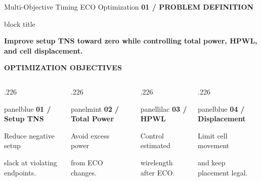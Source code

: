 \documentclass[aspectratio=169,10pt]{beamer}
\newcommand{\smalllabel}[1]{{\scriptsize\bfseries\color{Accent}\MakeUppercase{#1}}}
\newcommand{\takeaway}[1]{%
  \begin{beamercolorbox}[rounded=true,sep=0.15cm,wd=\linewidth]{block title}%
    \strut\textbf{#1}\strut
  \end{beamercolorbox}%
}
\newcommand{\slideposition}{}
\newcommand{\slidesubtitle}[1]{%
  \smalllabel{#1}%
}
\begin{document}
\renewcommand{\slideposition}{Summary 14 / 18}
\begin{frame}[label=summary-14]{Multi-Objective Timing ECO Optimization}
  \vspace{.01cm}
  \slidesubtitle{01 / Problem Definition}\par\vspace{.10cm}
  \takeaway{Improve setup TNS toward zero while controlling total power, HPWL, and cell displacement.}
  \vspace{.14cm}

  \smalllabel{Optimization Objectives}\par\vspace{.08cm}
  \begin{columns}[T,onlytextwidth]
    \begin{column}{.226\textwidth}
      \begin{beamercolorbox}[rounded=true,sep=.14cm,wd=\linewidth]{panelblue}
        {\small\bfseries\color{AccentBlue}01 / Setup TNS}\par\vspace{.11cm}
        {\scriptsize Reduce negative setup\par slack at violating endpoints.}
      \end{beamercolorbox}
    \end{column}
    \begin{column}{.226\textwidth}
      \begin{beamercolorbox}[rounded=true,sep=.14cm,wd=\linewidth]{panelmint}
        {\small\bfseries\color{Accent}02 / Total Power}\par\vspace{.11cm}
        {\scriptsize Avoid excess power\par from ECO changes.}
      \end{beamercolorbox}
    \end{column}
    \begin{column}{.226\textwidth}
      \begin{beamercolorbox}[rounded=true,sep=.14cm,wd=\linewidth]{panellilac}
        {\small\bfseries\color{AccentBlue}03 / HPWL}\par\vspace{.11cm}
        {\scriptsize Control estimated\par wirelength after ECO.}
      \end{beamercolorbox}
    \end{column}
    \begin{column}{.226\textwidth}
      \begin{beamercolorbox}[rounded=true,sep=.14cm,wd=\linewidth]{panelblue}
        {\small\bfseries\color{Accent}04 / Displacement}\par\vspace{.11cm}
        {\scriptsize Limit cell movement\par and keep placement legal.}
      \end{beamercolorbox}
    \end{column}
  \end{columns}


\end{frame}
\end{document}

